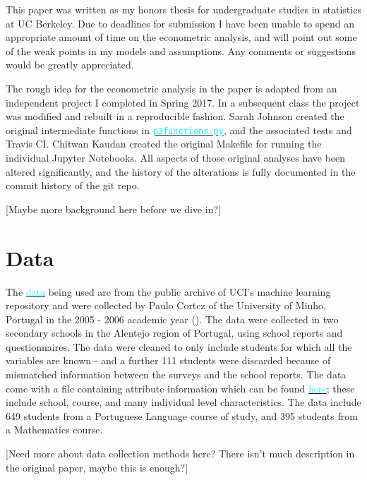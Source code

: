 \documentclass[12pt]{article}
\newcommand{\inlinecode}{\texttt}
\begin{document}
This paper was written as my honors thesis for undergraduate studies in statistics at UC Berkeley. Due to deadlines for submission I have been unable to spend an appropriate amount of time on the econometric analysis, and will point out some of the weak points in my models and assumptions. Any comments or suggestions would be greatly appreciated. 

The rough idea for the econometric analysis in the paper is adapted from an independent project I completed in Spring 2017. In a subsequent class the project was modified and rebuilt in a reproducible fashion. Sarah Johnson created the original intermediate functions in \href{https://github.com/nadavtadelis/Reproducible_Metrics/blob/master/p3functions.py}{\textcolor{cyan}{\inlinecode{p3functions.py}}}, and the associated tests and Travis CI. Chitwan Kaudan created the original Makefile for running the individual Jupyter Notebooks. All aspects of those original analyses have been altered significantly, and the history of the alterations is fully documented in the commit history of the git repo.

\textcolor{BrickRed}{[Maybe more background here before we dive in?]}


\newpage
\section{Data}
The \href{https://archive.ics.uci.edu/ml/datasets/Student+Performance#}{\textcolor{cyan}{data}} being used are from the public archive of UCI's machine learning repository and were collected by Paulo Cortez of the University of Minho, Portugal in the 2005 - 2006 academic year (\cite{data_paper}). The data were collected in two secondary schools in the Alentejo region of Portugal, using school reports and questionnaires. The data were cleaned to only include students for which all the variables are known - and a further 111 students were discarded because of mismatched information between the surveys and the school reports. The data come with a file containing attribute information which can be found \href{https://archive.ics.uci.edu/ml/datasets/Student+Performance#}{\textcolor{cyan}{here}}; these include school, course, and many individual level characteristics. The data include 649 students from a Portuguese Language course of study, and 395 students from a Mathematics course. 

\textcolor{BrickRed}{[Need more about data collection methods here? There isn't much description in the original paper, maybe this is enough?]}
\end{document}
